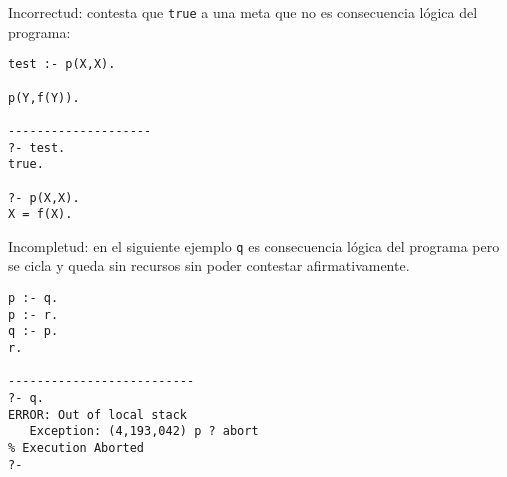 \documentclass[11pt,letterpaper]{article}
\begin{document}
\bi

\item Incorrectud: {\pl} contesta que \verb-true- a una meta que no es 
consecuencia l\'ogica del programa:
\begin{verbatim}
test :- p(X,X).

p(Y,f(Y)).

--------------------
?- test.
true.

?- p(X,X).
X = f(X).
\end{verbatim}

\item Incompletud: en el siguiente ejemplo \verb-q- es consecuencia l\'ogica 
del programa pero {\pl} se cicla y queda sin recursos sin poder contestar 
afirmativamente.
\begin{verbatim}
p :- q.
p :- r.
q :- p.
r.

--------------------------
?- q.
ERROR: Out of local stack
   Exception: (4,193,042) p ? abort
% Execution Aborted
?- 
\end{verbatim}

\ei





\nocite*{}
\end{document}
